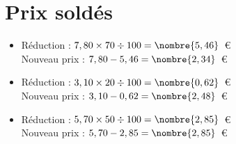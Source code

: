 \documentclass[a4paper,11pt,fleqn]{article}
\begin{document}
\section{Prix soldés}
\begin{itemize}

  \item Réduction : $7,80\times70\div100=\nombre{5,46}$~€\\
  Nouveau prix : $7,80-5,46=\nombre{2,34}$~€
  \item Réduction : $3,10\times20\div100=\nombre{0,62}$~€\\
  Nouveau prix : $3,10-0,62=\nombre{2,48}$~€
  \item Réduction : $5,70\times50\div100=\nombre{2,85}$~€\\
  Nouveau prix : $5,70-2,85=\nombre{2,85}$~€
\end{itemize}
\end{document}
